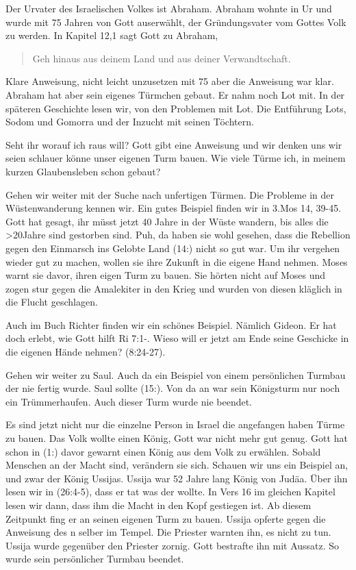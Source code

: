\documentclass[14pt]{../../inc/mybib}
\newcommand{\q}[1]{\blockquote{#1}}
\begin{document}
    Der Urvater des Israelischen Volkes ist Abraham. Abraham wohnte in Ur und wurde mit 75 Jahren von Gott auserwählt, der Gründungsvater vom Gottes Volk zu werden. In Kapitel 12,1 sagt Gott zu Abraham, \q{Geh hinaus aus deinem Land und aus deiner Verwandtschaft.} Klare Anweisung, nicht leicht unzusetzen mit 75 aber die Anweisung war klar. Abraham hat aber sein eigenes Türmchen gebaut. Er nahm noch Lot mit. In der späteren Geschichte lesen wir, von den Problemen mit Lot. Die Entführung Lots, Sodom und Gomorra und der Inzucht mit seinen Töchtern.  
    
    Seht ihr worauf ich raus will? Gott gibt eine Anweisung und wir denken uns wir seien schlauer könne unser eigenen Turm bauen. Wie viele Türme ich, in meinem kurzen Glaubensleben schon gebaut?

    Gehen wir weiter mit der Suche nach unfertigen Türmen. Die Probleme in der Wüstenwanderung kennen wir. Ein gutes Beispiel finden wir in 3.Mos 14, 39-45. Gott hat gesagt, ihr müsst jetzt 40 Jahre in der Wüste wandern, bis alles die >20Jahre sind gestorben sind. Puh, da haben sie wohl gesehen, dass die Rebellion gegen den Einmarsch ins Gelobte Land (14:) nicht so gut war. Um ihr vergehen wieder gut zu machen, wollen sie ihre Zukunft in die eigene Hand nehmen. Moses warnt sie davor, ihren eigen Turm zu bauen. Sie hörten nicht auf Moses und zogen stur gegen die Amalekiter in den Krieg und wurden von diesen kläglich in die Flucht geschlagen.

    Auch im Buch Richter finden wir ein schönes Beispiel. Nämlich Gideon. Er hat doch erlebt, wie Gott hilft Ri 7:1-. Wieso will er jetzt am Ende seine Geschicke in die eigenen Hände nehmen? (8:24-27). 

    Gehen wir weiter zu Saul. Auch da ein Beispiel von einem persönlichen Turmbau der nie fertig wurde. Saul sollte (15:). Von da an war sein Königsturm nur noch ein Trümmerhaufen. Auch dieser Turm wurde nie beendet.

    Es sind jetzt nicht nur die einzelne Person in Israel die angefangen haben Türme zu bauen. Das Volk wollte einen König, Gott war nicht mehr gut genug. Gott hat schon in (1:) davor gewarnt einen König aus dem Volk zu erwählen. Sobald Menschen an der Macht sind, verändern sie sich. Schauen wir uns ein Beispiel an, und zwar der König Ussijas. Ussija war 52 Jahre lang König von Judäa. Über ihn lesen wir in (26:4-5), dass er tat was der \herr{} wollte. In Vers 16 im gleichen Kapitel lesen wir dann, dass ihm die Macht in den Kopf gestiegen ist. Ab diesem Zeitpunkt fing er an seinen eigenen Turm zu bauen. Ussija opferte gegen die Anweisung des \herr n selber im Tempel. Die Priester warnten ihn, es nicht zu tun. Ussija wurde gegenüber den Priester zornig. Gott bestrafte ihn mit Aussatz. So wurde sein persönlicher Turmbau beendet.
\end{document}
